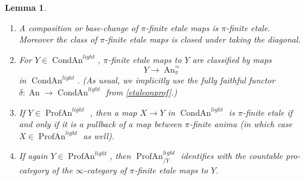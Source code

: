 \documentclass[12pt]{article}
\newtheorem{lemma}[theorem]{Lemma}
\newcommand{\on}{\operatorname}
\begin{document}
\begin{lemma}\label{pifiniteproperties}
\begin{enumerate}
\item A composition or base-change of $\pi$-finite etale maps is $\pi$-finite etale.  Moreover the class of $\pi$-finite etale maps is closed under taking the diagonal.
\item For $Y\in \on{CondAn}^{light}$, $\pi$-finite etale maps to $Y$ are classified by maps
$$Y\to \on{An}_{\pi}^\simeq$$
in $\on{CondAn}^{light}$.  (As usual, we implicitly use the fully faithful functor $\delta:\on{An}\to\on{CondAn}^{light}$ from \ref{etaleonprof}.)
\item If $Y\in \on{ProfAn}^{light}$ , then a map $X\to Y$ in $\on{CondAn}^{light}$ is $\pi$-finite etale if and only if it is a pullback of a map between $\pi$-finite anima (in which case $X\in\on{ProfAn}^{light}$ as well).
\item If again $Y\in \on{ProfAn}^{light}$, then $\on{ProfAn}^{light}_{/Y}$ identifies with the countable pro-category of the $\infty$-category of $\pi$-finite etale maps to $Y$.
\end{enumerate}
\end{lemma}
\end{document}
